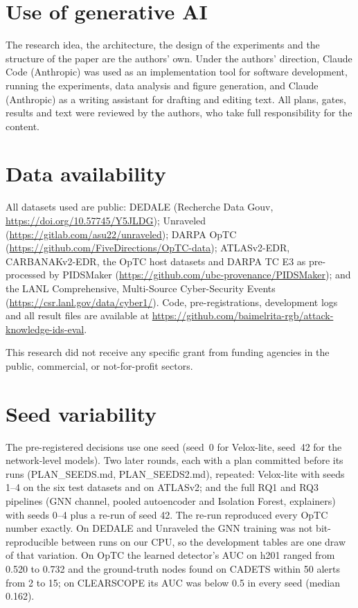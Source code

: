 \documentclass[acmlarge,screen,review]{acmart}
\begin{document}
\section*{Use of generative AI}
The research idea, the architecture, the design of the experiments and the structure of the paper are the authors'
own. Under the authors' direction, Claude Code (Anthropic) was used as an implementation tool for software
development, running the experiments, data analysis and figure generation, and Claude (Anthropic) as a writing
assistant for drafting and editing text. All plans, gates, results and
text were reviewed by the authors, who take full responsibility for the content.

\section*{Data availability}
All datasets used are public: DEDALE (Recherche Data Gouv, \url{https://doi.org/10.57745/Y5JLDG}); Unraveled
(\url{https://gitlab.com/asu22/unraveled}); DARPA OpTC (\url{https://github.com/FiveDirections/OpTC-data});
ATLASv2-EDR, CARBANAKv2-EDR, the OpTC host datasets and DARPA TC E3 as pre-processed by PIDSMaker
(\url{https://github.com/ubc-provenance/PIDSMaker}); and the LANL Comprehensive, Multi-Source Cyber-Security Events
(\url{https://csr.lanl.gov/data/cyber1/}). Code, pre-registrations, development logs and all result files are available
at \url{https://github.com/baimelrita-rgb/attack-knowledge-ids-eval}.

\begin{acks}
This research did not receive any specific grant from funding agencies in the public, commercial, or not-for-profit
sectors.
\end{acks}




\appendix

\section{Seed variability}\label{app:seeds}
The pre-registered decisions use one seed (seed~0 for Velox-lite, seed~42 for the network-level models). Two later
rounds, each with a plan committed before its runs (PLAN\_SEEDS.md, PLAN\_SEEDS2.md), repeated: Velox-lite with seeds
1--4 on the six test datasets and on ATLASv2; and the full RQ1 and RQ3 pipelines (GNN channel, pooled autoencoder and
Isolation Forest, explainers) with seeds 0--4 plus a re-run of seed 42. The re-run reproduced every OpTC number
exactly. On DEDALE and Unraveled the GNN training was not bit-reproducible between runs on our CPU, so the
development tables are one draw of that variation. On OpTC the learned detector's AUC on h201 ranged from 0.520 to
0.732 and the ground-truth nodes found on CADETS within 50 alerts from 2 to 15; on CLEARSCOPE its AUC was below 0.5 in
every seed (median 0.162).
\end{document}
